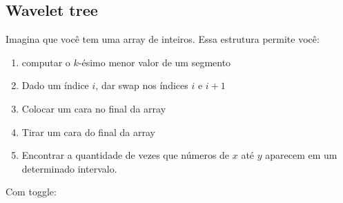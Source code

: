\subsection{Wavelet tree}

Imagina que você tem uma array de inteiros. Essa estrutura 
permite você:

\begin{enumerate}
    \item computar o $k$-ésimo menor valor de um segmento 
    \item Dado um índice $i$, dar swap nos índices $i$ e $i+1$
    \item Colocar um cara no final da array
    \item Tirar um cara do final da array
    \item Encontrar a quantidade de vezes que números de $x$ até $y$
          aparecem em um determinado intervalo. 
\end{enumerate}


Com toggle:

